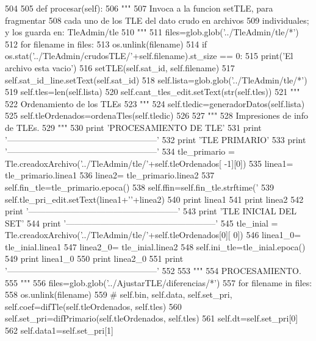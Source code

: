 \begin{DoxyCode}
504 
505     def procesar(self):
506         """
507         Invoca a la funcion setTLE, para fragmentar
508         cada uno de los TLE del dato crudo en archivos
509         individuales; y los guarda en: TleAdmin/tle
510         """
511         files=glob.glob('../TleAdmin/tle/*')
512         for filename in files:
513             os.unlink(filename)
514         if os.stat('../TleAdmin/crudosTLE/'+self.filename).st_size == 0:
515             print('El archivo esta vacio')
516         setTLE(self.sat_id, self.filename)
517         self.sat_id_line.setText(self.sat_id)
518         self.lista=glob.glob('../TleAdmin/tle/*')
519         self.tles=len(self.lista)
520         self.cant_tles_edit.setText(str(self.tles))
521         """
522         Ordenamiento de los TLEs
523         """
524         self.tledic=generadorDatos(self.lista)
525         self.tleOrdenados=ordenaTles(self.tledic)
526 
527         """
528         Impresiones de info de TLEs.
529         """
530         print 'PROCESAMIENTO DE TLE'
531         print '-----------------------------------------------------'
532         print 'TLE PRIMARIO'
533         print '-----------------------------------------------------'
534         tle_primario = Tle.creadoxArchivo('../TleAdmin/tle/'+self.tleOrdenados[
      -1][0])
535         linea1= tle_primario.linea1
536         linea2= tle_primario.linea2
537         self.fin_tle=tle_primario.epoca()
538         self.ffin=self.fin_tle.strftime('%
539         self.tle_pri_edit.setText(linea1+'\n'+linea2)
540         print linea1
541         print linea2
542         print '-----------------------------------------------------'
543         print 'TLE INICIAL DEL SET'
544         print '-----------------------------------------------------'
545         tle_inial = Tle.creadoxArchivo('../TleAdmin/tle/'+self.tleOrdenados[0][
      0])
546         linea1_0= tle_inial.linea1
547         linea2_0= tle_inial.linea2
548         self.ini_tle=tle_inial.epoca()
549         print linea1_0
550         print linea2_0
551         print '-----------------------------------------------------'
552         
553         """
554         PROCESAMIENTO.
555         """
556         files=glob.glob('../AjustarTLE/diferencias/*')
557         for filename in files:
558             os.unlink(filename)
559 #        self.bin, self.data, self.set_pri, self.coef=difTle(self.tleOrdenados,
       self.tles)
560         self.set_pri=difPrimario(self.tleOrdenados, self.tles)
561         self.dt=self.set_pri[0]
562         self.data1=self.set_pri[1]

\end{DoxyCode}
